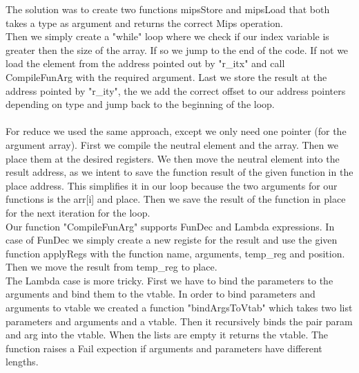 \documentclass[12pt]{article}
\numberwithin{listing}{section}
\begin{document}
The solution was to create two functions mipsStore and mipsLoad that both takes a type as argument and returns the correct Mips operation.\\
Then we simply create a "while" loop where we check if our index variable is greater then the size of the array. If so we jump to the end of the code. If not we load the element from the address pointed out by "r\_itx" and call CompileFunArg with the required argument. Last we store the result at the address pointed by "r\_ity", the we add the correct offset to our address pointers depending on type and jump back to the beginning of the loop. \\ \\
For reduce we used the same approach, except we only need one pointer (for the argument array). First we compile the neutral element and the array. Then we place them at the desired registers. We then move the neutral element into the result address, as we intent to save the function result of the given function in the place address. This simplifies it in our loop because the two arguments for our functions is the arr[i] and place. Then we save the result of the function in place for the next iteration for the loop.
\\
Our function "CompileFunArg" supports FunDec and Lambda expressions. In case of FunDec we simply create a new registe for the result and use the given function applyRegs with the function name, arguments, temp\_reg and position. Then we move the result from temp\_reg to place.\\
The Lambda case is more tricky. First we have to bind the parameters to the arguments and bind them to the vtable. In order to bind parameters and arguments to vtable we created a function "bindArgsToVtab" which takes two list parameters and arguments and a vtable. Then it recursively binds the pair param and arg into the vtable. When the lists are empty it returns the vtable. The function raises a Fail expection if arguments and parameters have different lengths.
%
\end{document}

